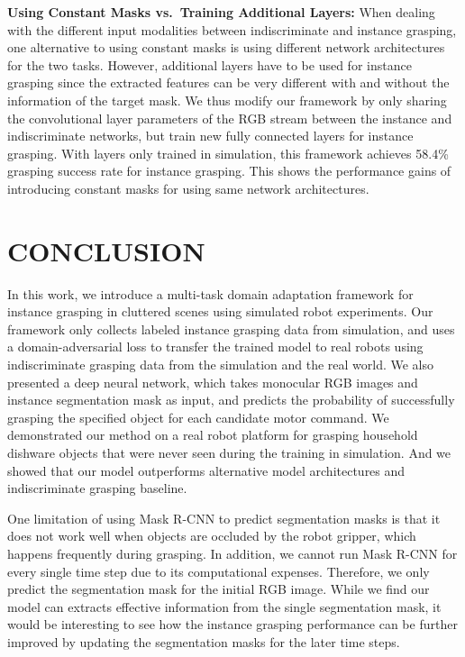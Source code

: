 \documentclass[letterpaper, 10 pt, conference]{ieeeconf}  %
\begin{document}
\textbf{Using Constant Masks vs.\ Training Additional Layers:} 
When dealing with the different input modalities between indiscriminate and instance grasping, one alternative to using constant masks is using different network architectures for the two tasks. However, additional layers have to be used for instance grasping since the extracted features can be very different with and without the information of the target mask. We thus modify our framework by only sharing the convolutional layer parameters of the RGB stream between the instance and indiscriminate networks, but train new fully connected layers for instance grasping. With layers only trained in simulation, this framework achieves 58.4\% grasping success rate for instance grasping. This shows the performance gains of introducing constant masks for using same network architectures.

\section{CONCLUSION}%

In this work, we introduce a multi-task domain adaptation framework for instance grasping in cluttered scenes using simulated robot experiments. Our framework only collects labeled instance grasping data from simulation, and uses a domain-adversarial loss to transfer the trained model to real robots using indiscriminate grasping data from the simulation and the real world. We also presented a deep neural network, which takes monocular RGB images and instance segmentation mask as input, and predicts the probability of successfully grasping the specified object for each candidate motor command. We demonstrated our method on a real robot platform for grasping household dishware objects that were never seen during the training in simulation. And we showed that our model outperforms alternative model architectures and indiscriminate grasping baseline. 

One limitation of using Mask R-CNN to predict segmentation masks is that it does not work well when objects are occluded by the robot gripper, which happens frequently during grasping. In addition, we cannot run Mask R-CNN for every single time step due to its computational expenses. Therefore, we only predict the segmentation mask for the initial RGB image. While we find our model can extracts effective information from the single segmentation mask, it would be interesting to see how the instance grasping performance can be further improved by updating the segmentation masks for the later time steps.
\end{document}
